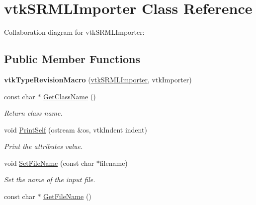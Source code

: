 \hypertarget{classvtkSRMLImporter}{
\section{vtkSRMLImporter Class Reference}
\label{classvtkSRMLImporter}
}


Collaboration diagram for vtkSRMLImporter:\subsection*{Public Member Functions}
\begin{DoxyCompactItemize}
\item 
\hypertarget{classvtkSRMLImporter_a55112c27f26ed582ed654c2e0c44a8b5}{
{\bfseries vtkTypeRevisionMacro} (\hyperlink{classvtkSRMLImporter}{vtkSRMLImporter}, vtkImporter)}
\label{classvtkSRMLImporter_a55112c27f26ed582ed654c2e0c44a8b5}

\item 
\hypertarget{classvtkSRMLImporter_a6e6898f0899fa2de4029cb6ab7b4f911}{
const char $\ast$ \hyperlink{classvtkSRMLImporter_a6e6898f0899fa2de4029cb6ab7b4f911}{GetClassName} ()}
\label{classvtkSRMLImporter_a6e6898f0899fa2de4029cb6ab7b4f911}

\begin{DoxyCompactList}\small\item\em Return class name. \item\end{DoxyCompactList}\item 
\hypertarget{classvtkSRMLImporter_a62d3aa1a2a9441077b1d3569f9f69e03}{
void \hyperlink{classvtkSRMLImporter_a62d3aa1a2a9441077b1d3569f9f69e03}{PrintSelf} (ostream \&os, vtkIndent indent)}
\label{classvtkSRMLImporter_a62d3aa1a2a9441077b1d3569f9f69e03}

\begin{DoxyCompactList}\small\item\em Print the attributes value. \item\end{DoxyCompactList}\item 
\hypertarget{classvtkSRMLImporter_a299db4483a9fc1a8c6a2f2e425e890ae}{
void \hyperlink{classvtkSRMLImporter_a299db4483a9fc1a8c6a2f2e425e890ae}{SetFileName} (const char $\ast$filename)}
\label{classvtkSRMLImporter_a299db4483a9fc1a8c6a2f2e425e890ae}

\begin{DoxyCompactList}\small\item\em Set the name of the input file. \item\end{DoxyCompactList}\item 
\hypertarget{classvtkSRMLImporter_a8ff4832be5cd522ec081de29895386b5}{
const char $\ast$ \hyperlink{classvtkSRMLImporter_a8ff4832be5cd522ec081de29895386b5}{GetFileName} ()}
\label{classvtkSRMLImporter_a8ff4832be5cd522ec081de29895386b5}


\end{DoxyCompactItemize}
